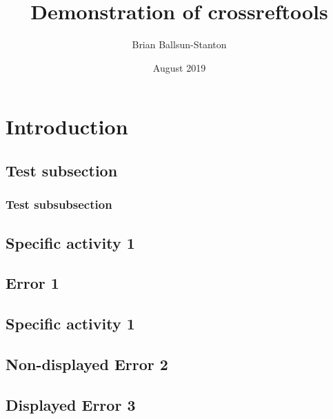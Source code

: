 \documentclass{article}
\title{Demonstration of crossreftools}
\author{Brian Ballsun-Stanton}
\date{August 2019}
\begin{document}
\maketitle

\tablesofcontentsanderrors

\section{Introduction}


\lipsum[1]
\subsection{Test subsection}
\lipsum[1]
\subsubsection{Test subsubsection}
\lipsum[1]
\subsection{Specific activity 1}
\lipsum[1]

\solution{\lipsum[1]}{\lipsum[1]}{\lipsum[1]}

\subsection{Error 1}
\label{Error: This was a silly error}
\lipsum[1]
\subsection{Specific activity 1}
\lipsum[1]
\subsection{Non-displayed Error 2}
\label{This was a different silly error that isn't displayed}
\lipsum[1]
\subsection{Displayed Error 3}
\label{Error: This was a different silly error that is displayed}
\lipsum[1-3]
\end{document}
